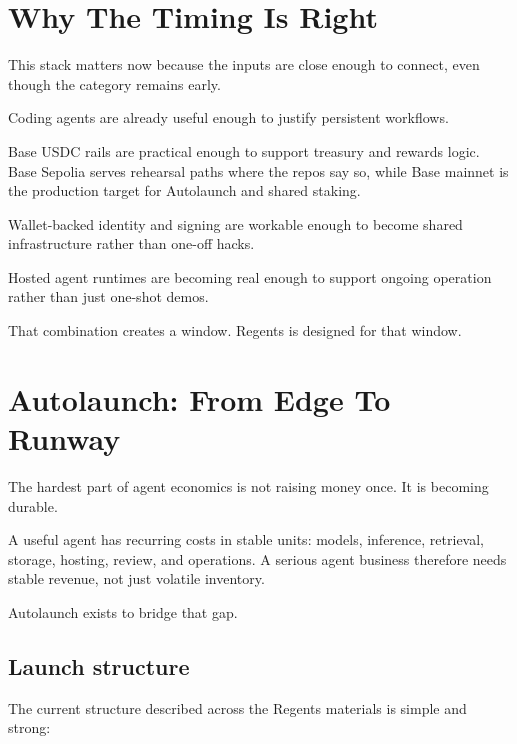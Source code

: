 \documentclass[11pt]{article}
\begin{document}
\section{Why The Timing Is Right}

This stack matters now because the inputs are close enough to connect, even though the category remains early.

Coding agents are already useful enough to justify persistent workflows.

Base USDC rails are practical enough to support treasury and rewards logic. Base Sepolia serves rehearsal paths where the repos say so, while Base mainnet is the production target for Autolaunch and shared staking.

Wallet-backed identity and signing are workable enough to become shared infrastructure rather than one-off hacks.

Hosted agent runtimes are becoming real enough to support ongoing operation rather than just one-shot demos.

That combination creates a window. Regents is designed for that window.

\section{Autolaunch: From Edge To Runway}

The hardest part of agent economics is not raising money once. It is becoming durable.

A useful agent has recurring costs in stable units: models, inference, retrieval, storage, hosting, review, and operations. A serious agent business therefore needs stable revenue, not just volatile inventory.

Autolaunch exists to bridge that gap.

\subsection{Launch structure}

The current structure described across the Regents materials is simple and strong:
\end{document}
